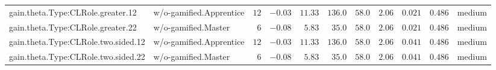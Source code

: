 \documentclass[6pt,a4paper]{article}
\begin{document}
\begin{landscape}
{\begin{longtable}{llrrrrrrrrl}
gain.theta.Type:CLRole.greater.12&w/o-gamified.Apprentice&$12$&$-0.03$&$11.33$&$136.0$&$ 58.0$&$2.06$&$0.021$&$0.486$&medium\tabularnewline
gain.theta.Type:CLRole.greater.22&w/o-gamified.Master&$ 6$&$-0.08$&$ 5.83$&$ 35.0$&$ 58.0$&$2.06$&$0.021$&$0.486$&medium\tabularnewline
gain.theta.Type:CLRole.two.sided.12&w/o-gamified.Apprentice&$12$&$-0.03$&$11.33$&$136.0$&$ 58.0$&$2.06$&$0.041$&$0.486$&medium\tabularnewline
gain.theta.Type:CLRole.two.sided.22&w/o-gamified.Master&$ 6$&$-0.08$&$ 5.83$&$ 35.0$&$ 58.0$&$2.06$&$0.041$&$0.486$&medium\tabularnewline
\hline
\end{longtable}}

\end{landscape}
\end{document}
